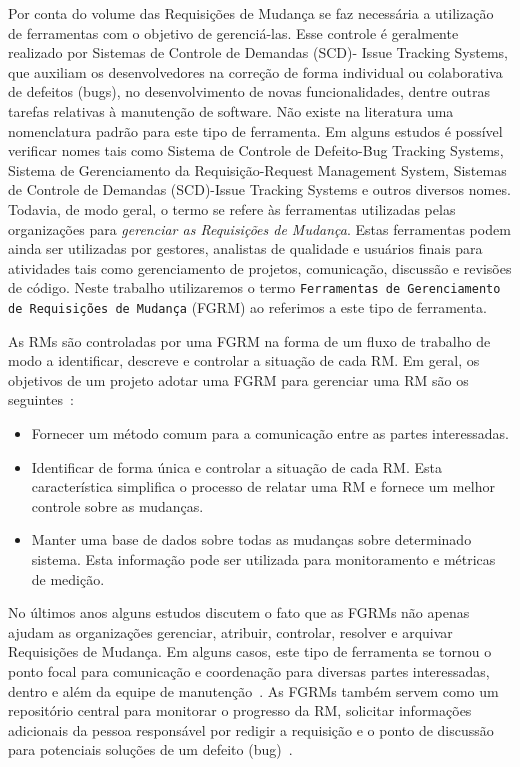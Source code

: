 Por conta do volume das Requisições de Mudança se faz necessária a utilização de
ferramentas com o objetivo de gerenciá-las. Esse controle é geralmente realizado
por Sistemas de Controle de Demandas (SCD)- Issue Tracking Systems, que auxiliam
os desenvolvedores na correção de forma individual ou colaborativa de defeitos
(bugs), no desenvolvimento de novas funcionalidades, dentre outras tarefas
relativas à manutenção de software. Não existe na literatura uma nomenclatura
padrão para este tipo de ferramenta. Em alguns estudos é possível verificar
nomes tais como Sistema de Controle de Defeito\@-\@ Bug Tracking Systems,
Sistema de Gerenciamento da Requisição\@-\@ Request Management System, Sistemas
de Controle de Demandas (SCD)\@-\@ Issue Tracking Systems e outros diversos
nomes.  Todavia, de modo geral, o termo se refere às ferramentas utilizadas
pelas organizações para \textit{gerenciar as Requisições de Mudança}. Estas
ferramentas podem ainda ser utilizadas por gestores, analistas de qualidade e
usuários finais para atividades tais como gerenciamento de projetos,
comunicação, discussão e revisões de código. Neste trabalho utilizaremos o termo
\texttt{Ferramentas de Gerenciamento de Requisições de Mudança} (FGRM) ao
referimos a este tipo de ferramenta.

As RMs são controladas por uma FGRM na forma de um fluxo de trabalho de modo a
identificar, descreve e controlar a situação de cada RM\@. Em geral, os objetivos
de um projeto adotar uma FGRM para gerenciar uma RM são os
seguintes~\cite{tripathy2014software}:

\begin{itemize}
	\item Fornecer um método comum para a comunicação entre as partes
		interessadas.
	\item Identificar de forma única e controlar a situação de cada RM\@. Esta
		característica simplifica o processo de relatar uma RM e fornece um
		melhor controle sobre as mudanças.
	\item Manter uma base de dados sobre todas as mudanças sobre determinado
		sistema. Esta informação pode ser utilizada para monitoramento e
		métricas de medição.
\end{itemize}

No últimos anos alguns estudos discutem o fato que as FGRMs não apenas ajudam
as organizações gerenciar, atribuir, controlar, resolver e arquivar Requisições
de Mudança. Em alguns casos, este tipo de ferramenta se tornou o ponto focal
para comunicação e coordenação para diversas partes interessadas, dentro e além
da equipe de manutenção~\cite{Bertram:2010:CCB:1718918.1718972}.  As FGRMs
também servem como um repositório central para monitorar o progresso da RM,
solicitar informações adicionais da pessoa responsável por redigir a requisição
e o ponto de discussão para potenciais soluções de um defeito
(bug)~\cite{zimmermann2009improving}.

